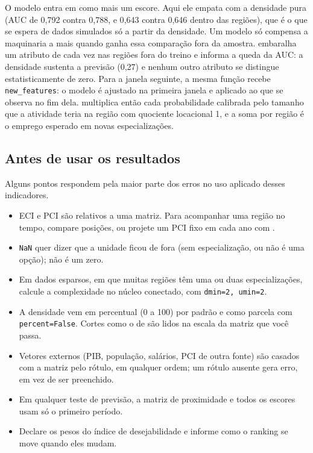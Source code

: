 O modelo entra em  como mais um escore. Aqui
ele empata com a densidade pura (AUC de 0{,}792
contra 0{,}788, e
0{,}643 contra
0{,}646 dentro das regiões), que é o que
se espera de dados simulados só a partir da densidade. Um modelo só compensa a maquinaria a mais
quando ganha essa comparação fora da amostra. 
embaralha um atributo de cada vez nas regiões fora do treino e informa a
queda da AUC: a densidade sustenta a previsão
(0{,}27) e nenhum outro atributo se
distingue estatisticamente de zero. Para a janela seguinte, a mesma função recebe
\texttt{new\_features}: o modelo é ajustado na primeira janela e
aplicado ao que se observa no fim dela. 
multiplica então cada probabilidade calibrada pelo tamanho que a
atividade teria na região com quociente locacional 1, e a soma por
região é o emprego esperado em novas especializações.

\subsection{Antes de usar os resultados}

Alguns pontos respondem pela maior parte dos erros no uso aplicado
desses indicadores.

\begin{itemize}[leftmargin=1.5em]
  \item ECI e PCI são relativos a uma matriz. Para acompanhar uma região
    no tempo, compare posições, ou projete um PCI fixo em cada ano com
    .
  \item \texttt{NaN} quer dizer que a unidade ficou de fora (sem
    especialização, ou não é uma opção); não é um zero.
  \item Em dados esparsos, em que muitas regiões têm uma ou duas
    especializações, calcule a complexidade no núcleo conectado, com
    \texttt{dmin=2, umin=2}.
  \item A densidade vem em percentual (0 a 100) por padrão e como
    parcela com \texttt{percent=False}. Cortes como o de
     são lidos na escala da matriz que você passa.
  \item Vetores externos (PIB, população, salários, PCI de outra fonte)
    são casados com a matriz pelo rótulo, em qualquer ordem; um rótulo
    ausente gera erro, em vez de ser preenchido.
  \item Em qualquer teste de previsão, a matriz de proximidade e todos
    os escores usam só o primeiro período.
  \item Declare os pesos do índice de desejabilidade e informe como o
    ranking se move quando eles mudam.
\end{itemize}
